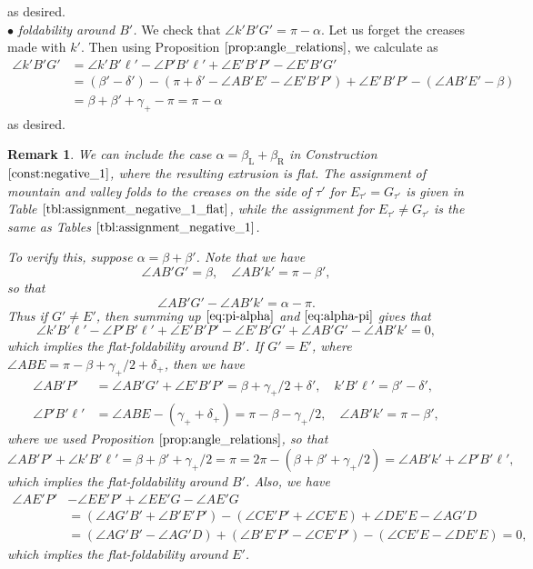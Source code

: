 \documentclass[11pt]{amsart}
\newtheorem{remark}[theorem]{Remark}
\numberwithin{equation}{section}
\numberwithin{theorem}{section}
\newcommand{\Lt}{\ensuremath{\mathrm{L}}}
\newcommand{\Rt}{\ensuremath{\mathrm{R}}}
\begin{document}
as desired.\\
$\bullet$ \emph{foldability around $B'$. }We check that $\angle k'B'G'=\pi -\alpha$.
Let us forget the creases made with $k'$.
Then using Proposition $\ref{prop:angle_relations}$, we calculate as
\begin{equation}\label{eq:pi-alpha}
\begin{aligned}
\angle k'B'G'&=\angle k'B'\ell'-\angle P'B'\ell'+\angle E'B'P'-\angle E'B'G'\\
&=(\beta'-\delta')-(\pi +\delta'-\angle AB'E'-\angle E'B'P')+\angle E'B'P'-(\angle AB'E'-\beta )\\
&=\beta +\beta' +\gamma_+-\pi =\pi -\alpha
\end{aligned}
\end{equation}
as desired.
\begin{remark}\rm
We can include the case $\alpha =\beta_\Lt +\beta_\Rt$ in Construction $\ref{const:negative_1}$, where the resulting extrusion is flat.
The assignment of mountain and valley folds to the creases on the side of $\tau'$ for $E_{\tau'}=G_{\tau'}$
is given in Table $\ref{tbl:assignment_negative_1_flat}$,
while the assignment for $E_{\tau'}\neq G_{\tau'}$ is the same as Tables $\ref{tbl:assignment_negative_1}$.

To verify this, suppose $\alpha =\beta +\beta'$.
Note that we have
\begin{equation*}
\angle AB'G'=\beta ,\quad\angle AB'k'=\pi -\beta',
\end{equation*}
so that
\begin{equation}\label{eq:alpha-pi}
\angle AB'G'-\angle AB'k'=\alpha -\pi .
\end{equation}
Thus if $G'\neq E'$, then summing up $\eqref{eq:pi-alpha}$ and $\eqref{eq:alpha-pi}$ gives that
\begin{equation*}
\angle k'B'\ell'-\angle P'B'\ell'+\angle E'B'P'-\angle E'B'G' +\angle AB'G' -\angle AB'k'=0,
\end{equation*}
which implies the flat-foldability around $B'$.
If $G' =E'$, where $\angle ABE=\pi -\beta +\gamma_+/2+\delta_+$, then we have
\begin{align*}
\angle AB'P'&=\angle AB'G'+\angle E'B'P'=\beta +\gamma_+/2+\delta',\quad k'B'\ell' =\beta'-\delta',\\
\angle P'B'\ell'&=\angle ABE-(\gamma_++\delta_+)=\pi -\beta -\gamma_+/2,\quad\angle AB'k'=\pi -\beta',
\end{align*}
where we used Proposition $\ref{prop:angle_relations}$, so that
\begin{equation*}
\angle AB'P'+\angle k'B'\ell' =\beta+\beta'+\gamma_+/2 =\pi =2\pi -(\beta +\beta'+\gamma_+/2)=\angle AB'k'+\angle P'B'\ell',
\end{equation*}
which implies the flat-foldability around $B'$.
Also, we have
\begin{align*}
\angle AE'P'&-\angle EE'P'+\angle EE'G-\angle AE'G\\
&=(\angle AG'B'+\angle B'E'P')-(\angle CE'P'+\angle CE'E)+\angle DE'E-\angle AG'D\\
&=(\angle AG'B'-\angle AG'D)+(\angle B'E'P'-\angle CE'P')-(\angle CE'E-\angle DE'E)=0,
\end{align*}
which implies the flat-foldability around $E'$.
\end{remark}
\end{document}
